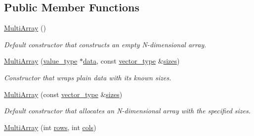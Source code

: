 \subsection*{Public Member Functions}
\begin{DoxyCompactItemize}
\item 
\hypertarget{class_d_o_1_1_multi_array_a596f3b4b4084da422cb3320e165e1d89}{\hyperlink{class_d_o_1_1_multi_array_a596f3b4b4084da422cb3320e165e1d89}{Multi\-Array} ()}\label{class_d_o_1_1_multi_array_a596f3b4b4084da422cb3320e165e1d89}

\begin{DoxyCompactList}\small\item\em Default constructor that constructs an empty N-\/dimensional array. \end{DoxyCompactList}\item 
\hypertarget{class_d_o_1_1_multi_array_a9883e52ac7683fbd42f04e82def4dd63}{\hyperlink{class_d_o_1_1_multi_array_a9883e52ac7683fbd42f04e82def4dd63}{Multi\-Array} (\hyperlink{class_d_o_1_1_multi_array_a265a253612b46abed17c61b0a5e5ce30}{value\-\_\-type} $\ast$\hyperlink{class_d_o_1_1_multi_array_a36e4d11a00a3572c87bf7e913e9b5ca1}{data}, const \hyperlink{class_d_o_1_1_multi_array_aacf98e49e90f9aeead0ff8885fae3ac7}{vector\-\_\-type} \&\hyperlink{class_d_o_1_1_multi_array_a15f0ce2877b385c9505f042faa705694}{sizes})}\label{class_d_o_1_1_multi_array_a9883e52ac7683fbd42f04e82def4dd63}

\begin{DoxyCompactList}\small\item\em Constructor that wraps plain data with its known sizes. \end{DoxyCompactList}\item 
\hypertarget{class_d_o_1_1_multi_array_a12c16e1c2846b8ca00471291ba650988}{\hyperlink{class_d_o_1_1_multi_array_a12c16e1c2846b8ca00471291ba650988}{Multi\-Array} (const \hyperlink{class_d_o_1_1_multi_array_aacf98e49e90f9aeead0ff8885fae3ac7}{vector\-\_\-type} \&\hyperlink{class_d_o_1_1_multi_array_a15f0ce2877b385c9505f042faa705694}{sizes})}\label{class_d_o_1_1_multi_array_a12c16e1c2846b8ca00471291ba650988}

\begin{DoxyCompactList}\small\item\em Default constructor that allocates an N-\/dimensional array with the specified sizes. \end{DoxyCompactList}\item 
\hypertarget{class_d_o_1_1_multi_array_acbb77f86b0c9386505a84adcd76f66e7}{\hyperlink{class_d_o_1_1_multi_array_acbb77f86b0c9386505a84adcd76f66e7}{Multi\-Array} (int \hyperlink{class_d_o_1_1_multi_array_a48cdd99e4e82f74c1adae2bd69970220}{rows}, int \hyperlink{class_d_o_1_1_multi_array_a3cefa469a7524d4bbc80531ebb9b5df4}{cols})}\label{class_d_o_1_1_multi_array_acbb77f86b0c9386505a84adcd76f66e7}


\end{DoxyCompactItemize}
